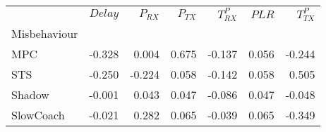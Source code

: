 \begin{tabular}{lrrrrrr}
\toprule
{} &  $Delay$ &  $P_{RX}$ &  $P_{TX}$ &  $T^P_{RX}$ &  $PLR$ &  $T^P_{TX}$ \\
Misbehaviour &          &           &           &             &        &             \\
\midrule
MPC          &   -0.328 &     0.004 &     0.675 &      -0.137 &  0.056 &      -0.244 \\
STS          &   -0.250 &    -0.224 &     0.058 &      -0.142 &  0.058 &       0.505 \\
Shadow       &   -0.001 &     0.043 &     0.047 &      -0.086 &  0.047 &      -0.048 \\
SlowCoach    &   -0.021 &     0.282 &     0.065 &      -0.039 &  0.065 &      -0.349 \\
\bottomrule
\end{tabular}
